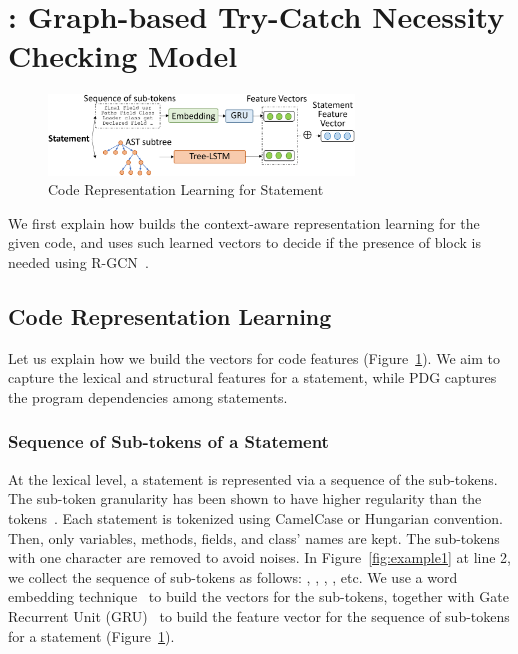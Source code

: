 \section{{\xblock}: Graph-based Try-Catch Necessity Checking Model}
\label{detect:sec}

\begin{figure}[t]
	\centering
	\includegraphics[width=3.2in]{features-2.png}
        \vspace{-0.08in}
	\caption{Code Representation Learning for Statement}
	\label{fig:feature}	
\end{figure}


We first explain how {\xblock} builds the context-aware representation
learning for the given code, and uses such learned vectors to decide
if the presence of  block is needed using
R-GCN~\cite{rgcn}.

\subsection{Code Representation Learning}
\label{replearn:sec}

Let us explain how we build the vectors for code features
(Figure~\ref{fig:feature}). We aim to capture the lexical and
structural features for a statement, while PDG captures the program
dependencies among statements.

\vspace{-1pt}
\subsubsection{Sequence of Sub-tokens of a Statement}

At the lexical level, a statement is represented via a sequence of the
sub-tokens. The sub-token granularity has been shown to have higher
regularity than the tokens~\cite{icse20-methodname}. Each statement is
tokenized using CamelCase or Hungarian convention. Then, only
variables, methods, fields, and class' names are kept. The sub-tokens
with one character are removed to avoid noises. In
Figure~\ref{fig:example1} at line 2, we collect the sequence of
sub-tokens as follows: , , ,
, etc. We use a word embedding technique~\cite{glove2014}
to build the vectors for the sub-tokens, together with Gate Recurrent
Unit (GRU)~\cite{chung2014empirical} to build the feature vector for
the sequence of sub-tokens for a statement (Figure~\ref{fig:feature}).


